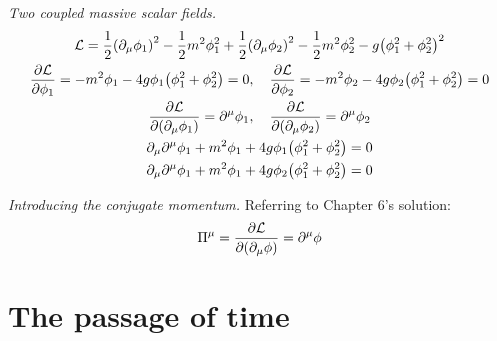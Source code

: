 \documentclass{report}
\begin{document}
\begin{subquests}
	\item \emph{Two coupled massive scalar fields.}
	\begin{gather*}
		\mathcal L = \frac{1}{2}\pqty{\partial_{\mu}\phi_1}^2 - \frac{1}{2}m^2\phi_1^2 + \frac{1}{2}\pqty{\partial_{\mu}\phi_2}^2 - \frac{1}{2}m^2\phi_2^2 - g\pqty{\phi_1^2 + \phi_2^2}^2 \\
		\pdv{\mathcal L}{\phi_1} = -m^2\phi_1 - 4g\phi_1\pqty{\phi_1^2 + \phi_2^2} = 0, \quad \pdv{\mathcal L}{\phi_2} = -m^2\phi_2 - 4g\phi_2\pqty{\phi_1^2 + \phi_2^2} = 0 \\
		\pdv{\mathcal L}{\pqty{\partial_{\mu}\phi_1}} = \partial^{\mu}\phi_1, \quad \pdv{\mathcal L}{\pqty{\partial_{\mu}\phi_2}} = \partial^{\mu}\phi_2 \\	
		\partial_{\mu}\partial^{\mu}\phi_1 + m^2\phi_1 + 4g\phi_1\pqty{\phi_1^2 + \phi_2^2} = 0 \\
		\partial_{\mu}\partial^{\mu}\phi_1 + m^2\phi_1 + 4g\phi_2\pqty{\phi_1^2 + \phi_2^2} = 0
	\end{gather*}
	\item \emph{Introducing the conjugate momentum.} Referring to Chapter 6's solution:
	\begin{gather*}
		\Pi^{\mu} = \pdv{\mathcal L}{\pqty{\partial_{\mu}\phi}} = \partial^{\mu}\phi
	\end{gather*}
\end{subquests}


\chapter{The passage of time}
\end{document}
